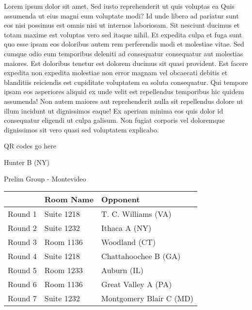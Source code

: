 \documentclass{article}%
\begin{document}
\vspace*{8pt}%
\linebreak%
\newline%
\newline%
Lorem ipsum dolor sit amet. Sed iusto reprehenderit ut quis voluptas ea Quis assumenda ut eius magni eum voluptate modi? Id unde libero ad pariatur sunt eos nisi possimus est omnis nisi ut internos laboriosam. Sit nesciunt ducimus et totam maxime est voluptas vero sed itaque nihil. Et expedita culpa et fuga sunt quo esse ipsam eos doloribus autem rem perferendis modi et molestiae vitae.\newline%
\newline%
Sed cumque odio eum temporibus deleniti ad consequatur consequatur aut molestias maiores. Est doloribus tenetur est dolorem ducimus sit quasi provident. Est facere expedita non expedita molestiae non error magnam vel obcaecati debitis et blanditiis reiciendis est cupiditate voluptatem ea soluta consequatur. Qui tempore ipsam eos asperiores aliquid ex unde velit est repellendus temporibus hic quidem assumenda!\newline%
\newline%
Non autem maiores aut reprehenderit nulla sit repellendus dolore ut illum incidunt ut dignissimos eaque! Ex aperiam minima eos quis dolor id consequatur eligendi ut culpa galisum. Non fugiat corporis vel doloremque dignissimos sit vero quasi sed voluptatem explicabo.\newline%
\newline%
%
\vspace*{30pt}%
\begin{center}%
\begin{Huge}%
QR codes go here%
\end{Huge}%
\end{center}%
\newpage%
%
\begin{center}%
\begin{Huge}%
Hunter B (NY)%
\end{Huge}%
\vspace*{8pt}%
\linebreak%
\begin{Large}%
Prelim Group {-} Montevideo%
\end{Large}%
\end{center}%
\begin{tabularx}{\textwidth}{|c|Y|Y|}%
\hline%
&Room Name&Opponent\\%
\hline%
Round 1&Suite 1218&T. C. Williams (VA)\\%
Round 2&Suite 1232&Ithaca A (NY)\\%
Round 3&Room 1136&Woodland (CT)\\%
Round 4&Suite 1218&Chattahoochee B (GA)\\%
Round 5&Room 1233&Auburn (IL)\\%
Round 6&Room 1136&Great Valley A (PA)\\%
Round 7&Suite 1232&Montgomery Blair C (MD)\\%
\hline%
\end{tabularx}%
\end{document}

